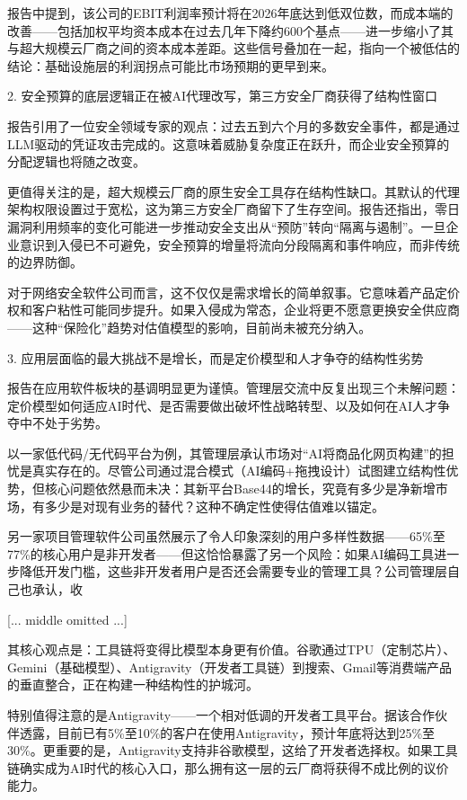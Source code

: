 \documentclass[11pt]{ctexart}
\begin{document}
报告中提到，该公司的EBIT利润率预计将在2026年底达到低双位数，而成本端的改善——包括加权平均资本成本在过去几年下降约600个基点——进一步缩小了其与超大规模云厂商之间的资本成本差距。这些信号叠加在一起，指向一个被低估的结论：基础设施层的利润拐点可能比市场预期的更早到来。

2. 安全预算的底层逻辑正在被AI代理改写，第三方安全厂商获得了结构性窗口

报告引用了一位安全领域专家的观点：过去五到六个月的多数安全事件，都是通过LLM驱动的凭证攻击完成的。这意味着威胁复杂度正在跃升，而企业安全预算的分配逻辑也将随之改变。

更值得关注的是，超大规模云厂商的原生安全工具存在结构性缺口。其默认的代理架构权限设置过于宽松，这为第三方安全厂商留下了生存空间。报告还指出，零日漏洞利用频率的变化可能进一步推动安全支出从“预防”转向“隔离与遏制”。一旦企业意识到入侵已不可避免，安全预算的增量将流向分段隔离和事件响应，而非传统的边界防御。

对于网络安全软件公司而言，这不仅仅是需求增长的简单叙事。它意味着产品定价权和客户粘性可能同步提升。如果入侵成为常态，企业将更不愿意更换安全供应商——这种“保险化”趋势对估值模型的影响，目前尚未被充分纳入。

3. 应用层面临的最大挑战不是增长，而是定价模型和人才争夺的结构性劣势

报告在应用软件板块的基调明显更为谨慎。管理层交流中反复出现三个未解问题：定价模型如何适应AI时代、是否需要做出破坏性战略转型、以及如何在AI人才争夺中不处于劣势。

以一家低代码/无代码平台为例，其管理层承认市场对“AI将商品化网页构建”的担忧是真实存在的。尽管公司通过混合模式（AI编码+拖拽设计）试图建立结构性优势，但核心问题依然悬而未决：其新平台Base44的增长，究竟有多少是净新增市场，有多少是对现有业务的替代？这种不确定性使得估值难以锚定。

另一家项目管理软件公司虽然展示了令人印象深刻的用户多样性数据——65\%至77\%的核心用户是非开发者——但这恰恰暴露了另一个风险：如果AI编码工具进一步降低开发门槛，这些非开发者用户是否还会需要专业的管理工具？公司管理层自己也承认，收

[... middle omitted ...]

其核心观点是：工具链将变得比模型本身更有价值。谷歌通过TPU（定制芯片）、Gemini（基础模型）、Antigravity（开发者工具链）到搜索、Gmail等消费端产品的垂直整合，正在构建一种结构性的护城河。

特别值得注意的是Antigravity——一个相对低调的开发者工具平台。据该合作伙伴透露，目前已有5\%至10\%的客户在使用Antigravity，预计年底将达到25\%至30\%。更重要的是，Antigravity支持非谷歌模型，这给了开发者选择权。如果工具链确实成为AI时代的核心入口，那么拥有这一层的云厂商将获得不成比例的议价能力。
\end{document}
